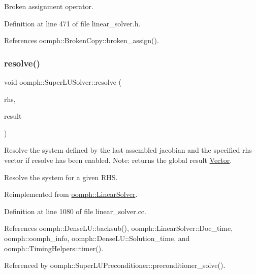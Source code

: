 Broken assignment operator. 



Definition at line 471 of file linear\+\_\+solver.\+h.



References oomph\+::\+Broken\+Copy\+::broken\+\_\+assign().

\mbox{\label{classoomph_1_1SuperLUSolver_acef6e1b3bf469061777866d97689ba77}} 
\subsubsection{\texorpdfstring{resolve()}{resolve()}}
{\footnotesize\ttfamily void oomph\+::\+Super\+L\+U\+Solver\+::resolve (\begin{DoxyParamCaption}\item[{const \hyperlink{classoomph_1_1DoubleVector}{Double\+Vector} \&}]{rhs,  }\item[{\hyperlink{classoomph_1_1DoubleVector}{Double\+Vector} \&}]{result }\end{DoxyParamCaption})\hspace{0.3cm}{\ttfamily [virtual]}}



Resolve the system defined by the last assembled jacobian and the specified rhs vector if resolve has been enabled. Note\+: returns the global result \hyperlink{classoomph_1_1Vector}{Vector}. 

Resolve the system for a given R\+HS. 

Reimplemented from \hyperlink{classoomph_1_1LinearSolver_a3b310d08333033edc119b2a5bd7dcbfb}{oomph\+::\+Linear\+Solver}.



Definition at line 1080 of file linear\+\_\+solver.\+cc.



References oomph\+::\+Dense\+L\+U\+::backsub(), oomph\+::\+Linear\+Solver\+::\+Doc\+\_\+time, oomph\+::oomph\+\_\+info, oomph\+::\+Dense\+L\+U\+::\+Solution\+\_\+time, and oomph\+::\+Timing\+Helpers\+::timer().



Referenced by oomph\+::\+Super\+L\+U\+Preconditioner\+::preconditioner\+\_\+solve().

\mbox{\label{classoomph_1_1SuperLUSolver_a7d59158ece5d377644f598ca60093be1}} 
